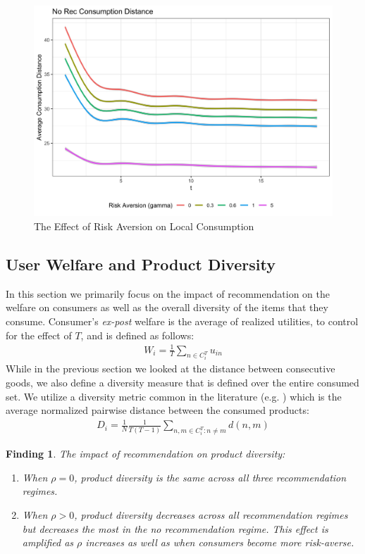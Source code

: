 \documentclass[sigconf]{acmart}
\newtheorem{finding}{Finding}
\begin{document}
\begin{figure}
\includegraphics[scale=0.1]{figures/consumption_dist_N_200T_20_no_rec_alpha}
\caption{The Effect of Risk Aversion on Local Consumption}
\label{fig:no_rec_risk_aversion}
\end{figure}

\subsection{User Welfare and Product Diversity}

In this section we primarily focus on the impact of recommendation on the welfare on consumers as well as the overall diversity of the items that they consume.
Consumer's \textit{ex-post} welfare is the average of realized utilities, to control for the effect of $T$, and is defined as follows:
\begin{align*}
W_i=\frac{1}{T}\sum_{n \in C_i^T} u_{in}
\end{align*}
While in the previous section we looked at the distance between consecutive goods, we also define a diversity measure that is defined over the entire consumed set. We utilize a diversity metric common in the literature (e.g. \cite{ziegler2005improving}) which is the average normalized pairwise distance between the consumed products:
\begin{align*}
D_i =\frac{1}{N} \frac{1}{T (T-1)}\sum_{n,m \in C_i^T: n \ne m} d(n,m)
\end{align*}

\begin{finding}\label{finding_diversity}
The impact of recommendation on product diversity:
\begin{enumerate}
\item When $\rho = 0$, product diversity is the same across all three recommendation regimes.
\item When $\rho > 0$, product diversity decreases across all recommendation regimes but decreases the most in the no recommendation regime. This effect is amplified as $\rho$ increases as well as when consumers become more risk-averse.
\end{enumerate}
\end{finding}
\end{document}
